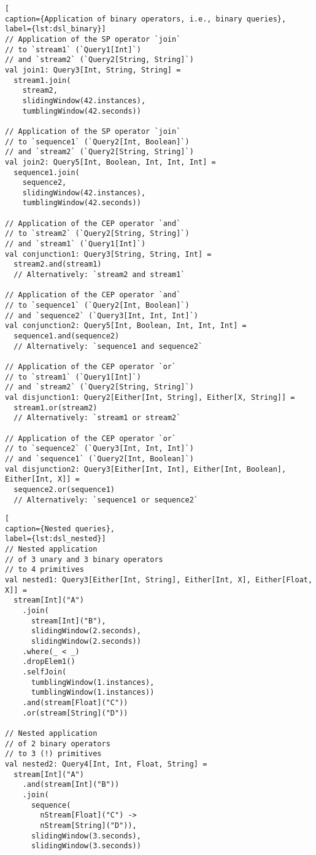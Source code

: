 \documentclass[article, type=bsc, colorback, accentcolor=tud8b, parskip=half, bibliography=totocnumbered]{tudthesis}
\begin{document}
\begin{lstlisting}[
caption={Application of binary operators, i.e., binary queries},
label={lst:dsl_binary}]
// Application of the SP operator `join`
// to `stream1` (`Query1[Int]`)
// and `stream2` (`Query2[String, String]`)
val join1: Query3[Int, String, String] =
  stream1.join(
    stream2,
    slidingWindow(42.instances),
    tumblingWindow(42.seconds))

// Application of the SP operator `join`
// to `sequence1` (`Query2[Int, Boolean]`)
// and `stream2` (`Query2[String, String]`)
val join2: Query5[Int, Boolean, Int, Int, Int] =
  sequence1.join(
    sequence2,
    slidingWindow(42.instances),
    tumblingWindow(42.seconds))

// Application of the CEP operator `and`
// to `stream2` (`Query2[String, String]`)
// and `stream1` (`Query1[Int]`)
val conjunction1: Query3[String, String, Int] =
  stream2.and(stream1)
  // Alternatively: `stream2 and stream1`

// Application of the CEP operator `and`
// to `sequence1` (`Query2[Int, Boolean]`)
// and `sequence2` (`Query3[Int, Int, Int]`)
val conjunction2: Query5[Int, Boolean, Int, Int, Int] =
  sequence1.and(sequence2)
  // Alternatively: `sequence1 and sequence2`

// Application of the CEP operator `or`
// to `stream1` (`Query1[Int]`)
// and `stream2` (`Query2[String, String]`)
val disjunction1: Query2[Either[Int, String], Either[X, String]] =
  stream1.or(stream2)
  // Alternatively: `stream1 or stream2`

// Application of the CEP operator `or`
// to `sequence2` (`Query3[Int, Int, Int]`)
// and `sequence1` (`Query2[Int, Boolean]`)
val disjunction2: Query3[Either[Int, Int], Either[Int, Boolean], Either[Int, X]] =
  sequence2.or(sequence1)
  // Alternatively: `sequence1 or sequence2`
\end{lstlisting}

\begin{lstlisting}[
caption={Nested queries},
label={lst:dsl_nested}]
// Nested application
// of 3 unary and 3 binary operators
// to 4 primitives
val nested1: Query3[Either[Int, String], Either[Int, X], Either[Float, X]] =
  stream[Int]("A")
    .join(
      stream[Int]("B"),
      slidingWindow(2.seconds),
      slidingWindow(2.seconds))
    .where(_ < _)
    .dropElem1()
    .selfJoin(
      tumblingWindow(1.instances),
      tumblingWindow(1.instances))
    .and(stream[Float]("C"))
    .or(stream[String]("D"))

// Nested application
// of 2 binary operators
// to 3 (!) primitives
val nested2: Query4[Int, Int, Float, String] =
  stream[Int]("A")
    .and(stream[Int]("B"))
    .join(
      sequence(
        nStream[Float]("C") ->
        nStream[String]("D")),
      slidingWindow(3.seconds),
      slidingWindow(3.seconds))
\end{lstlisting}
\end{document}
